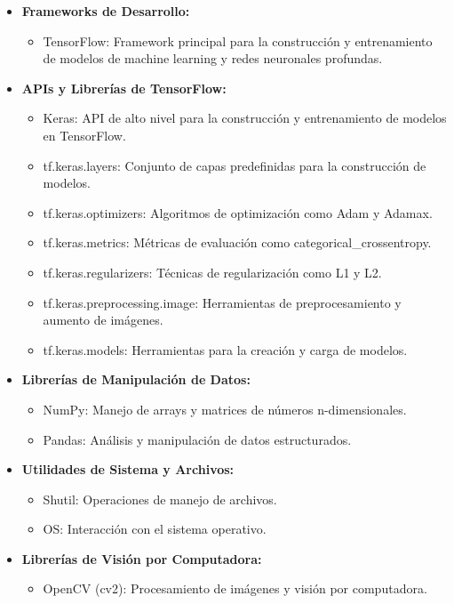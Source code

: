 \begin{itemize}
   \item \textbf{Frameworks de Desarrollo:}
   \begin{itemize}
       \item TensorFlow: Framework principal para la construcción y entrenamiento de modelos de machine learning y redes neuronales profundas.
   \end{itemize}

   \item \textbf{APIs y Librerías de TensorFlow:}
   \begin{itemize}
       \item Keras: API de alto nivel para la construcción y entrenamiento de modelos en TensorFlow.
       \item tf.keras.layers: Conjunto de capas predefinidas para la construcción de modelos.
       \item tf.keras.optimizers: Algoritmos de optimización como Adam y Adamax.
       \item tf.keras.metrics: Métricas de evaluación como categorical\_crossentropy.
       \item tf.keras.regularizers: Técnicas de regularización como L1 y L2.
       \item tf.keras.preprocessing.image: Herramientas de preprocesamiento y aumento de imágenes.
       \item tf.keras.models: Herramientas para la creación y carga de modelos.
   \end{itemize}

   \item \textbf{Librerías de Manipulación de Datos:}
   \begin{itemize}
       \item NumPy: Manejo de arrays y matrices de números n-dimensionales.
       \item Pandas: Análisis y manipulación de datos estructurados.
   \end{itemize}

   \item \textbf{Utilidades de Sistema y Archivos:}
   \begin{itemize}
       \item Shutil: Operaciones de manejo de archivos.
       \item OS: Interacción con el sistema operativo.
   \end{itemize}

   \item \textbf{Librerías de Visión por Computadora:}
   \begin{itemize}
       \item OpenCV (cv2): Procesamiento de imágenes y visión por computadora.
   \end{itemize}


\end{itemize}
